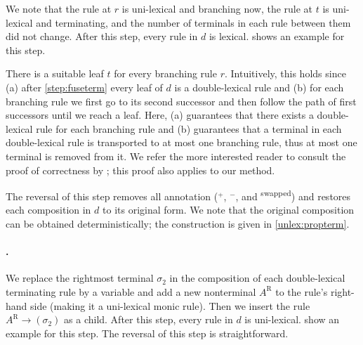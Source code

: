 \documentclass[../../document.tex]{subfiles}
\begin{document}
    We note that the rule at $r$ is uni-lexical and branching now, the rule at \(t\) is uni-lexical and terminating, and the number of terminals in each rule between them did not change.
    After this step, every rule in $d$ is lexical.
     shows an example for this step.

    There is a suitable leaf $t$ for every branching rule $r$.
    Intuitively, this holds since (a) after \cref{step:fuseterm} every leaf of $d$ is a double-lexical rule and (b) for each branching rule we first go to its second successor and then follow the path of first successors until we reach a leaf.
    Here, (a) guarantees that there exists a double-lexical rule for each branching rule and (b) guarantees that a terminal in each double-lexical rule is transported to at most one branching rule, thus at most one terminal is removed from it.
    We refer the more interested reader to consult the proof of correctness by \citet{EngMalMan18};
    this proof also applies to our method.

    The reversal of this step removes all annotation ($^+$, $^-$, and \textsuperscript{swapped}) and restores each composition in $d$ to its original form.
    We note that the original composition can be obtained deterministically; the construction is given in \cref{unlex:propterm}.

    \paragraph{.}
    We replace the rightmost terminal $\sigma_2$ in the composition of each double-lexical terminating rule by a variable and add a new nonterminal $A^{\text{R}}$ to the rule's right-hand side (making it a uni-lexical monic rule).
    Then we insert the rule $A^{\text{R}} \to (\sigma_2)$ as a child.
    After this step, every rule in $d$ is uni-lexical.
     show an example for this step.
    The reversal of this step is straightforward.
\end{document}
